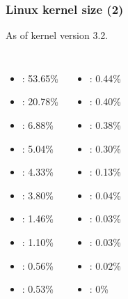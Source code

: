 \begin{frame}
  \frametitle{Linux kernel size (2)}
  As of kernel version 3.2.
  \begin{columns}
    \begin{itemize}
    \item {}: 53.65\%
    \item {}: 20.78\%
    \item {}: 6.88\%
    \item {}: 5.04\%
    \item {}: 4.33\%
    \item {}: 3.80\%
    \item {}: 1.46\%
    \item {}: 1.10\%
    \item {}: 0.56\%
    \item {}: 0.53\%
    \end{itemize}
    \begin{itemize}
    \item {}: 0.44\%
    \item {}: 0.40\%
    \item {}: 0.38\%
    \item {}: 0.30\%
    \item {}: 0.13\%
    \item {}: 0.04\%
    \item {}: 0.03\%
    \item {}: 0.03\%
    \item {}: 0.02\%
    \item {}: 0\%
    \end{itemize}
  \end{columns}
\end{frame}

